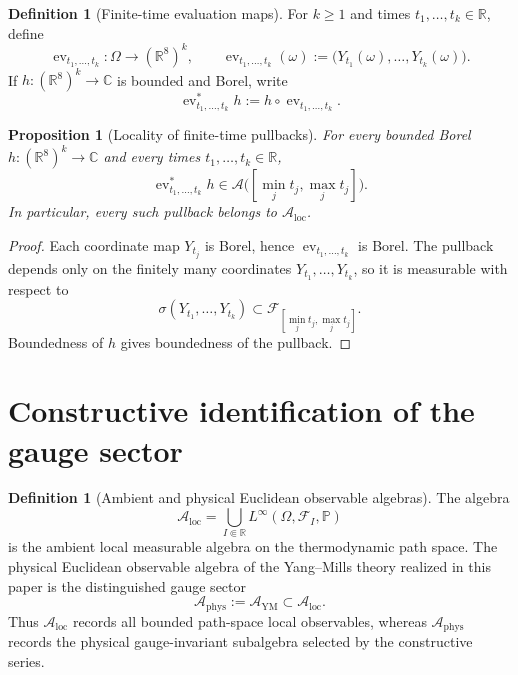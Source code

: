 \documentclass[11pt]{article}
\newtheorem{proposition}[theorem]{Proposition}
\theoremstyle{definition}
\newtheorem{definition}[theorem]{Definition}
\theoremstyle{remark}
\newcommand{\R}{\mathbb R}
\newcommand{\C}{\mathbb C}
\newcommand{\mcA}{\mathcal A}
\newcommand{\mcF}{\mathcal F}
\begin{document}
\begin{definition}[Finite-time evaluation maps]
\label{def:evaluation-maps}
For \(k\ge1\) and times \(t_1,\dots,t_k\in\R\), define
\[
\operatorname{ev}_{t_1,\dots,t_k}:\Omega\to(\R^8)^k,
\qquad
\operatorname{ev}_{t_1,\dots,t_k}(\omega)
:=
\bigl(Y_{t_1}(\omega),\dots,Y_{t_k}(\omega)\bigr).
\]
If \(h:(\R^8)^k\to\C\) is bounded and Borel, write
\[
\operatorname{ev}_{t_1,\dots,t_k}^*h:=h\circ\operatorname{ev}_{t_1,\dots,t_k}.
\]
\end{definition}

\begin{proposition}[Locality of finite-time pullbacks]
\label{prop:evaluation-maps}
For every bounded Borel \(h:(\R^8)^k\to\C\) and every times
\(t_1,\dots,t_k\in\R\),
\[
\operatorname{ev}_{t_1,\dots,t_k}^*h
\in
\mcA\bigl([\min_j t_j,\max_j t_j]\bigr).
\]
In particular, every such pullback belongs to \(\mcA_{\mathrm{loc}}\).
\end{proposition}

\begin{proof}
Each coordinate map \(Y_{t_j}\) is Borel, hence
\(\operatorname{ev}_{t_1,\dots,t_k}\) is Borel.  The pullback depends only on
the finitely many coordinates \(Y_{t_1},\dots,Y_{t_k}\), so it is measurable
with respect to
\[
\sigma(Y_{t_1},\dots,Y_{t_k})
\subset
\mcF_{[\min_j t_j,\max_j t_j]}.
\]
Boundedness of \(h\) gives boundedness of the pullback.
\end{proof}

\section{Constructive identification of the gauge sector}

\begin{definition}[Ambient and physical Euclidean observable algebras]
\label{def:ambient-physical}
The algebra
\[
\mcA_{\mathrm{loc}}=\bigcup_{I\Subset\R}L^\infty(\Omega,\mcF_I,\mathbb P)
\]
is the ambient local measurable algebra on the thermodynamic path space.
The physical Euclidean observable algebra of the Yang--Mills theory realized in
this paper is the distinguished gauge sector
\[
\mcA_{\mathrm{phys}}:=\mcA_{\mathrm{YM}}\subset\mcA_{\mathrm{loc}}.
\]
Thus \(\mcA_{\mathrm{loc}}\) records all bounded path-space local observables,
whereas \(\mcA_{\mathrm{phys}}\) records the physical gauge-invariant
subalgebra selected by the constructive series.
\end{definition}
\end{document}
